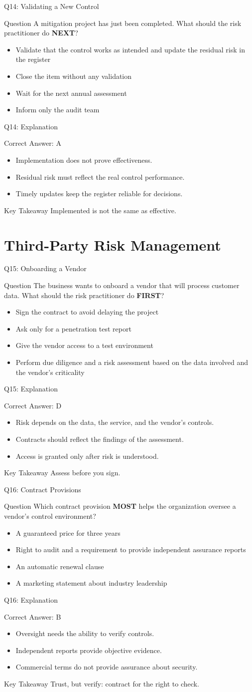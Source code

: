 \documentclass[aspectratio=169]{beamer}
\newcommand{\hq}[7]{%
	\begin{frame}{Q#1: #2}
		\begin{block}{Question}
			#3
		\end{block}
		\begin{itemize}
			#4
		\end{itemize}
	\end{frame}
	\begin{frame}{Q#1: Explanation}
		\begin{block}{Correct Answer: #5}
			\begin{itemize}
				#6
			\end{itemize}
		\end{block}
		\begin{alertblock}{Key Takeaway}
			#7
		\end{alertblock}
	\end{frame}
}
\begin{document}
	\hq{14}{Validating a New Control}
	{A mitigation project has just been completed. What should the risk practitioner do \textbf{NEXT}?}
	{\item[\textbf{(A)}] Validate that the control works as intended and update the residual risk in the register
		\item[\textbf{(B)}] Close the item without any validation
		\item[\textbf{(C)}] Wait for the next annual assessment
		\item[\textbf{(D)}] Inform only the audit team}
	{A}
	{\item Implementation does not prove effectiveness.
		\item Residual risk must reflect the real control performance.
		\item Timely updates keep the register reliable for decisions.}
	{Implemented is not the same as effective.}
	
	\section{Third-Party Risk Management}
	
	\hq{15}{Onboarding a Vendor}
	{The business wants to onboard a vendor that will process customer data. What should the risk practitioner do \textbf{FIRST}?}
	{\item[\textbf{(A)}] Sign the contract to avoid delaying the project
		\item[\textbf{(B)}] Ask only for a penetration test report
		\item[\textbf{(C)}] Give the vendor access to a test environment
		\item[\textbf{(D)}] Perform due diligence and a risk assessment based on the data involved and the vendor's criticality}
	{D}
	{\item Risk depends on the data, the service, and the vendor's controls.
		\item Contracts should reflect the findings of the assessment.
		\item Access is granted only after risk is understood.}
	{Assess before you sign.}
	
	\hq{16}{Contract Provisions}
	{Which contract provision \textbf{MOST} helps the organization oversee a vendor's control environment?}
	{\item[\textbf{(A)}] A guaranteed price for three years
		\item[\textbf{(B)}] Right to audit and a requirement to provide independent assurance reports
		\item[\textbf{(C)}] An automatic renewal clause
		\item[\textbf{(D)}] A marketing statement about industry leadership}
	{B}
	{\item Oversight needs the ability to verify controls.
		\item Independent reports provide objective evidence.
		\item Commercial terms do not provide assurance about security.}
	{Trust, but verify: contract for the right to check.}
	
\end{document}
